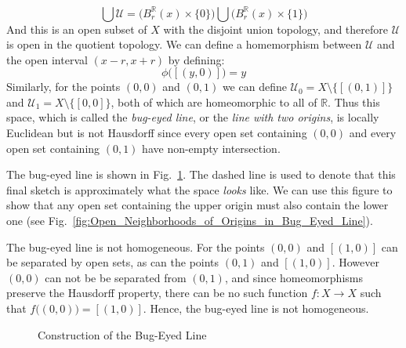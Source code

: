 \documentclass[oneside]{book}                                                  %
\begin{document}
\begin{example}
                \begin{equation}
                    \bigcup\mathcal{U}=\Big(B_{r}^{\mathbb{R}}(x)\times\{0\}\Big)
                        \bigcup\Big(B_{r}^{\mathbb{R}}(x)\times\{1\}\Big)
                \end{equation}
                And this is an open subset of $X$ with the disjoint union
                topology, and therefore $\mathcal{U}$ is open in the quotient
                topology. We can define a homemorphism between $\mathcal{U}$ and
                the open interval $(x-r,x+r)$ by defining:
                \begin{equation}
                    \phi\big([(y,0)]\big)=y
                \end{equation}
                Similarly, for the points $(0,0)$ and $(0,1)$ we can define
                $\mathcal{U}_{0}=X\setminus\{[(0,1)]\}$ and
                $\mathcal{U}_{1}=X\setminus\{[0,0]\}$, both of which are
                homeomorphic to all of $\mathbb{R}$. Thus this space, which is
                called the \textit{bug-eyed line}, or the
                \textit{line with two origins}, is
                locally Euclidean but is not Hausdorff since every open set
                containing $(0,0)$ and every open set containing $(0,1)$ have
                non-empty intersection.
            \end{example}
            The bug-eyed line is shown in
            Fig.~\ref{fig:Bug_Eyed_Line}. The dashed line is used to denote that
            this final sketch is approximately what the space \textit{looks}
            like. We can use this figure to show that any open set containing
            the upper origin must also contain the lower one
            (see Fig.~\ref{fig:Open_Neighborhoods_of_Origins_in_Bug_Eyed_Line}).
            \begin{example}
                The bug-eyed line is not homogeneous. For the points $(0,0)$ and
                $[(1,0)]$ can be separated by open sets, as can the points
                $(0,1)$ and $[(1,0)]$. However $(0,0)$ can not be be separated
                from $(0,1)$, and since homeomorphisms preserve the Hausdorff
                property, there can be no such function $f:X\rightarrow{X}$ such
                that $f\big((0,0)\big)=[(1,0)]$. Hence, the bug-eyed line is
                not homogeneous.
            \end{example}
            \begin{figure}[H]
                \centering
                \captionsetup{type=figure}
                
                \caption{Construction of the Bug-Eyed Line}
                \label{fig:Bug_Eyed_Line}
            \end{figure}
\end{document}
